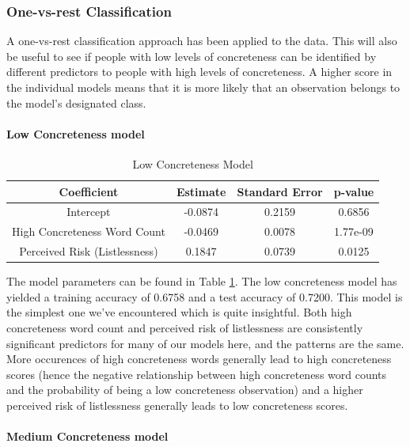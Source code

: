 \documentclass[12pt, a4paper]{article}
\begin{document}
\subsubsection{One-vs-rest Classification}

A one-vs-rest classification approach has been applied to the data. This will also be useful to see if people with low levels of concreteness can be identified by different predictors to people with high levels of concreteness. A higher score in the individual models means that it is more likely that an observation belongs to the model's designated class.

\paragraph{Low Concreteness model}

\begin{table}[ht]
\centering
\begin{tabular}{||c c c c||} 
 \hline
 Coefficient & Estimate & Standard Error & p-value \\ [0.5ex] 
 \hline\hline
 Intercept & -0.0874 & 0.2159 & 0.6856 \\ 
 High Concreteness Word Count & -0.0469 & 0.0078 & 1.77e-09 \\
 Perceived Risk (Listlessness)  & 0.1847 & 0.0739 & 0.0125 \\ [1ex] 
 \hline
\end{tabular}
\caption{Low Concreteness Model}
\label{table:low}
\end{table}

The model parameters can be found in Table \ref{table:low}. The low concreteness model has yielded a training accuracy of 0.6758 and a test accuracy of 0.7200. This model is the simplest one we've encountered which is quite insightful. Both high concreteness word count and perceived risk of listlessness are consistently significant predictors for many of our models here, and the patterns are the same. More occurences of high concreteness words generally lead to high concreteness scores (hence the negative relationship between high concreteness word counts and the probability of being a low concreteness observation) and a higher perceived risk of listlessness generally leads to low concreteness scores.

\paragraph{Medium Concreteness model}
\end{document}
